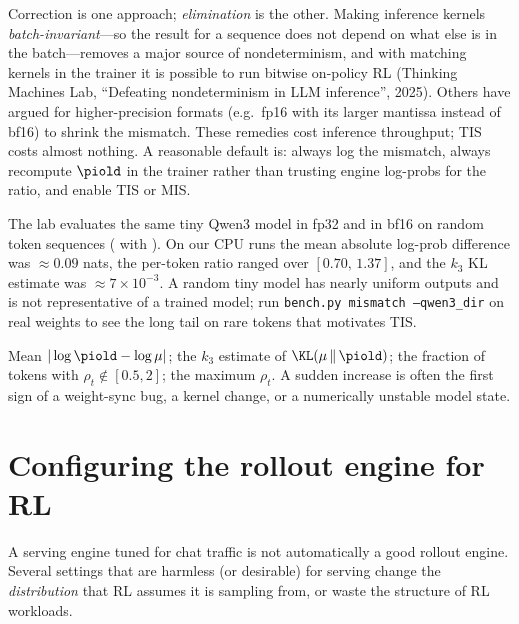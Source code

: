 Correction is one approach; \emph{elimination} is the other. Making inference kernels
\emph{batch-invariant}---so the result for a sequence does not depend on what else is in the
batch---removes a major source of nondeterminism, and with matching kernels in the trainer it
is possible to run bitwise on-policy RL (Thinking Machines Lab, ``Defeating nondeterminism in
LLM inference'', 2025). Others have argued for higher-precision formats (e.g.\ fp16 with its
larger mantissa instead of bf16) to shrink the mismatch. These remedies cost inference
throughput; TIS costs almost nothing. A reasonable default is: always log the mismatch, always
recompute $\piold$ in the trainer rather than trusting engine log-probs for the ratio, and
enable TIS or MIS.

\begin{napkinmath}
The lab evaluates the same tiny Qwen3 model in fp32 and in bf16 on random token sequences
( with ). On our CPU runs the mean
absolute log-prob difference was $\approx 0.09$ nats, the per-token ratio ranged over
$[0.70,\,1.37]$, and the $k_3$ KL estimate was $\approx 7\times10^{-3}$. A random tiny model
has nearly uniform outputs and is not representative of a trained model; run
\texttt{bench.py mismatch --qwen3\_dir} on real weights to see the long tail on rare
tokens that motivates TIS.
\end{napkinmath}

\begin{keyidea}
Mean $|\log\piold-\log\mu|$; the $k_3$ estimate of $\KL(\mu\,\|\,\piold)$; the fraction of
tokens with $\rho_t\notin[0.5,2]$; the maximum $\rho_t$. A sudden increase is often the first
sign of a weight-sync bug, a kernel change, or a numerically unstable model state.
\end{keyidea}
\section{Configuring the rollout engine for RL}\label{sec:rlsys:engine}

A serving engine tuned for chat traffic is not automatically a good rollout engine. Several
settings that are harmless (or desirable) for serving change the \emph{distribution} that RL
assumes it is sampling from, or waste the structure of RL workloads.

